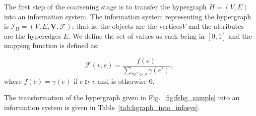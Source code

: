 \documentclass[twocolumn]{svjour3}          \smartqed
\begin{document}
The first step of the coarsening stage is to transfer the hypergraph $H=(V,E)$ into an information system. The information system representing the hypergraph is $\mathcal{I}_{H}=(V,E,\mathbf{V},\mathcal{F})$; that is, the objects are the vertices$V$ and the attributes are the hyperedges $E$. We define the set of values as each being in $[0,1]$ and the mapping function is defined as:

\begin{equation}\label{eq:hgraph_info_mapping}
\mathcal{F}(v,e) = \frac{f(e)}{\sum\nolimits_{\forall e' \triangleright v} \gamma(e')}, 
\end{equation}where $f(e)=\gamma(e)$ if $e \triangleright v$ and is otherwise 0.


The transformation of the hypergraph given in Fig.~\ref{fig:fehg_sample} into an information system is given in Table~\ref{tab:hgraph_into_infosys}. 
\end{document}
